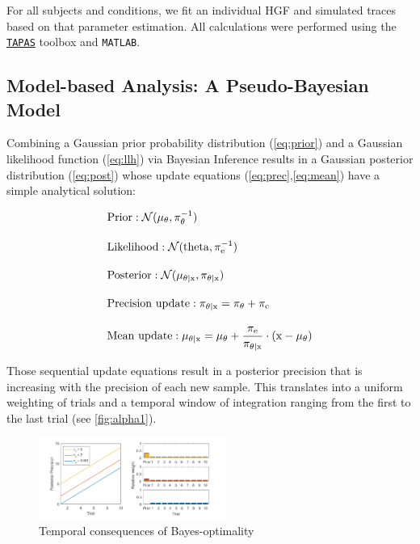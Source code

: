 \documentclass{article}
\begin{document}
\begin{multicols}{2}
For all subjects and conditions, we fit an individual HGF and simulated traces based on that parameter estimation. All calculations were performed using the \texttt{\href{https://translationalneuromodeling.github.io/tapas/}{TAPAS}} toolbox and \texttt{MATLAB}. \\

\subsection*{Model-based Analysis: A Pseudo-Bayesian Model}
Combining a Gaussian prior probability distribution (\ref{eq:prior}) and a Gaussian likelihood function (\ref{eq:llh}) via Bayesian Inference results in a Gaussian posterior distribution (\ref{eq:post}) whose update equations (\ref{eq:prec},\ref{eq:mean}) have a simple analytical solution:

\begin{align}
&\rm Prior: \mathcal{N}(\mu_\theta, \pi_\theta^{-1}) \label{eq:prior}  \\[1em] 
&\rm Likelihood: \mathcal{N}(theta, \pi_e^{-1})  \label{eq:llh} \\[1em] 
&\rm Posterior: \mathcal{N}(\mu_{\theta \mid x},\pi_{\theta \mid x})   \label{eq:post}\\[1em]
&\rm Precision \ update: \pi_{\theta \mid x} = \pi_\theta + \pi_e   \label{eq:prec}\\[1em] 
&\rm Mean \ update: \mu_{\theta \mid x} = \mu_\theta + \frac{\pi_e}{\pi_{\theta \mid x}}\cdot (x-\mu_\theta) \label{eq:mean}
\end{align}

Those sequential update equations result in a posterior precision that is increasing with the precision of each new sample. This translates into a uniform weighting of trials and a temporal window of integration ranging from the first to the last trial (see \autoref{fig:alpha1}).
\begin{figure}[H]
\hspace{-3mm}
\includegraphics[width=0.55\textwidth]{bayesopt.PNG}
  \caption{Temporal consequences of Bayes-optimality}
  \label{fig:alpha1}
\end{figure}


\end{multicols}
\end{document}
